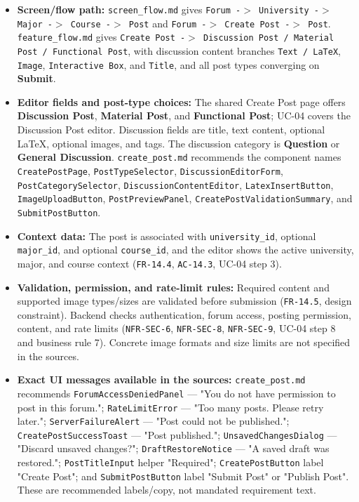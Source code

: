 \documentclass[12pt]{article}
\begin{document}
\begin{itemize}
\item \textbf{Screen/flow path:} \texttt{screen\_flow.md} gives \texttt{Forum -$>$ University -$>$ Major -$>$ Course -$>$ Post} and \texttt{Forum -$>$ Create Post -$>$ Post}. \texttt{feature\_flow.md} gives \texttt{Create Post -$>$ Discussion Post / Material Post / Functional Post}, with discussion content branches \texttt{Text / LaTeX}, \texttt{Image}, \texttt{Interactive Box}, and \texttt{Title}, and all post types converging on \textbf{Submit}.
\item \textbf{Editor fields and post-type choices:} The shared Create Post page offers \textbf{Discussion Post}, \textbf{Material Post}, and \textbf{Functional Post}; UC-04 covers the Discussion Post editor. Discussion fields are title, text content, optional LaTeX, optional images, and tags. The discussion category is \textbf{Question} or \textbf{General Discussion}. \texttt{create\_post.md} recommends the component names \texttt{CreatePostPage}, \texttt{PostTypeSelector}, \texttt{DiscussionEditorForm}, \texttt{PostCategorySelector}, \texttt{DiscussionContentEditor}, \texttt{LatexInsertButton}, \texttt{ImageUploadButton}, \texttt{PostPreviewPanel}, \texttt{CreatePostValidationSummary}, and \texttt{SubmitPostButton}.
\item \textbf{Context data:} The post is associated with \texttt{university\_id}, optional \texttt{major\_id}, and optional \texttt{course\_id}, and the editor shows the active university, major, and course context (\texttt{FR-14.4}, \texttt{AC-14.3}, UC-04 step 3).
\item \textbf{Validation, permission, and rate-limit rules:} Required content and supported image types/sizes are validated before submission (\texttt{FR-14.5}, design constraint). Backend checks authentication, forum access, posting permission, content, and rate limits (\texttt{NFR-SEC-6}, \texttt{NFR-SEC-8}, \texttt{NFR-SEC-9}, UC-04 step 8 and business rule 7). Concrete image formats and size limits are not specified in the sources.
\item \textbf{Exact UI messages available in the sources:} \texttt{create\_post.md} recommends \texttt{ForumAccessDeniedPanel} --- "You do not have permission to post in this forum."; \texttt{RateLimitError} --- "Too many posts. Please retry later."; \texttt{ServerFailureAlert} --- "Post could not be published."; \texttt{CreatePostSuccessToast} --- "Post published."; \texttt{UnsavedChangesDialog} --- "Discard unsaved changes?"; \texttt{DraftRestoreNotice} --- "A saved draft was restored."; \texttt{PostTitleInput} helper "Required"; \texttt{CreatePostButton} label "Create Post"; and \texttt{SubmitPostButton} label "Submit Post" or "Publish Post". These are recommended labels/copy, not mandated requirement text.

\end{itemize}
\end{document}
